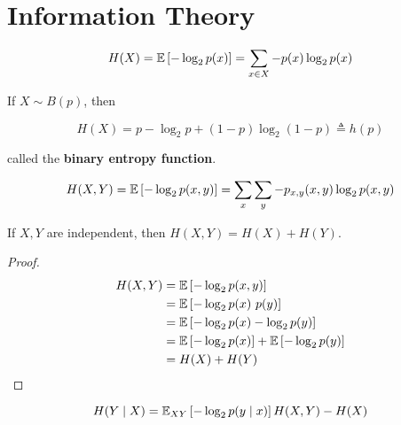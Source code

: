 \section{Information Theory}

\begin{definition}[Entropy]

  \begin{displaymath}
    H(X) = \operatorname{\mathbb{E}}\left[-\log_2 p(x)\right] = \sum_{x \in X} -p(x) \log_2 p(x)
  \end{displaymath}

  If $X \sim B(p)$, then

  \begin{displaymath}
    H(X) = p -\log_2 p + (1 - p) \log_2 (1 - p) \triangleq h(p)
  \end{displaymath}

  called the \textbf{binary entropy function}.

\end{definition}

\begin{definition}
  
  \begin{displaymath}
    H(X,Y) = \operatorname{\mathbb{E}}\left[-\log_2 p(x,y)\right] = \sum_{x} \sum_{y} -p_{x,y}(x,y) \log_2 p(x,y)
  \end{displaymath}

  If $X,Y$ are independent, then $H(X,Y) = H(X) + H(Y)$.

  \begin{proof}
    
    \begin{align*}
      H(X,Y) &= \operatorname{\mathbb{E}}\left[-\log_2 p(x,y)\right] \\
             &= \operatorname{\mathbb{E}}\left[-\log_2 p(x)\ p(y)\right] \\
             &= \operatorname{\mathbb{E}}\left[-\log_2 p(x) -\log_2 p(y)\right] \\
             &= \operatorname{\mathbb{E}}\left[-\log_2 p(x)\right] + \operatorname{\mathbb{E}}\left[-\log_2 p(y)\right] \\
             &= H(X) + H(Y)
    \end{align*}
    
  \end{proof}
  
\end{definition}

\begin{definition}
  
  \begin{displaymath}
    H(Y \mid X) = \operatorname{\mathbb{E}}_{XY}\left[-\log_2 p(y \mid x)\right] H(X,Y) - H(X)
  \end{displaymath}
  
\end{definition}

